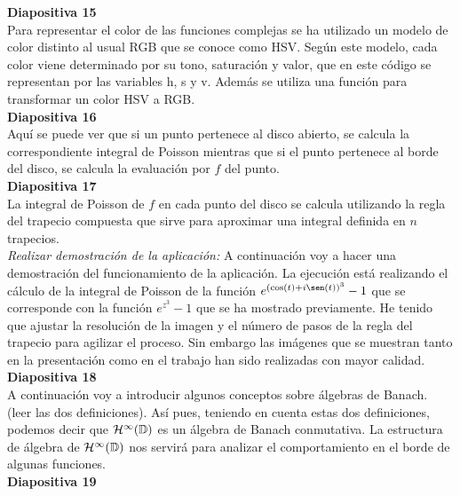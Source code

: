 \documentclass[spanish, a4paper, 12pt]{article}
\begin{document}
\textbf{Diapositiva 15} \\

Para representar el color de las funciones complejas se ha utilizado un modelo de color distinto al usual RGB que se conoce como HSV. Según este modelo, cada color viene determinado por su tono, saturación y valor, que en este código se representan por las variables h, s y v. Además se utiliza una función para transformar un color HSV a RGB. \\

\textbf{Diapositiva 16} \\

Aquí se puede ver que si un punto pertenece al disco abierto, se calcula la correspondiente integral de Poisson mientras que si el punto pertenece al borde del disco, se calcula la evaluación por $f$ del punto. \\

\textbf{Diapositiva 17} \\

La integral de Poisson de $f$ en cada punto del disco se calcula utilizando la regla del trapecio compuesta que sirve para aproximar una integral definida en $n$ trapecios. \\

\textit{Realizar demostración de la aplicación:} A continuación voy a hacer una demostración del funcionamiento de la aplicación. La ejecución está realizando el cálculo de la integral de Poisson de la función $e^{(\cos(t) + i \sen(t))^3} - 1$ que se corresponde con la función $e^{z^3} - 1$ que se ha mostrado previamente. He tenido que ajustar la resolución de la imagen y el número de pasos de la regla del trapecio para agilizar el proceso. Sin embargo las imágenes que se muestran tanto en la presentación como en el trabajo han sido realizadas con mayor calidad. \\

\textbf{Diapositiva 18} \\

A continuación voy a introducir algunos conceptos sobre álgebras de Banach. (leer las dos definiciones). Así pues, teniendo en cuenta estas dos definiciones, podemos decir que $\mathcal{H}^{\infty}(\mathbb{D})$ es un álgebra de Banach conmutativa. La estructura de álgebra de $\mathcal{H}^{\infty}(\mathbb{D})$ nos servirá para analizar el comportamiento en el borde de algunas funciones.\\

\textbf{Diapositiva 19} \\
\end{document}
